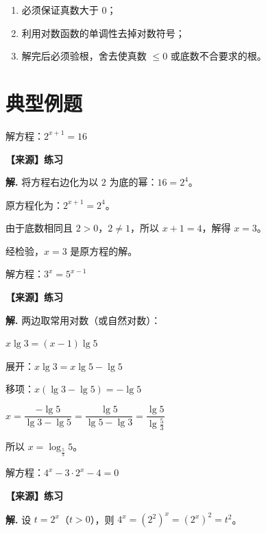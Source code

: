 \documentclass[11pt]{ctexrep}
\begin{document}
\begin{property}[解对数方程的注意事项]
    \begin{enumerate}
        \item 必须保证真数大于 $0$；
        \item 利用对数函数的单调性去掉对数符号；
        \item 解完后必须验根，舍去使真数 $\leq 0$ 或底数不合要求的根。
    \end{enumerate}
\end{property}

\section*{典型例题}

\begin{example}[基本指数方程]
    解方程：$2^{x+1} = 16$
    
    \textbf{【来源】练习}
\end{example}

\textbf{解.} 将方程右边化为以 $2$ 为底的幂：$16 = 2^4$。

原方程化为：$2^{x+1} = 2^4$。

由于底数相同且 $2 > 0$，$2 \neq 1$，所以 $x + 1 = 4$，解得 $x = 3$。

经检验，$x = 3$ 是原方程的解。

\begin{example}[不同底数的指数方程]
    解方程：$3^x = 5^{x-1}$
    
    \textbf{【来源】练习}
\end{example}

\textbf{解.} 两边取常用对数（或自然对数）：

$x\lg 3 = (x-1)\lg 5$

展开：$x\lg 3 = x\lg 5 - \lg 5$

移项：$x(\lg 3 - \lg 5) = -\lg 5$

$x = \dfrac{-\lg 5}{\lg 3 - \lg 5} = \dfrac{\lg 5}{\lg 5 - \lg 3} = \dfrac{\lg 5}{\lg \frac{5}{3}}$

所以 $x = \log_{\frac{5}{3}} 5$。

\begin{example}[可化为二次型的指数方程]
    解方程：$4^x - 3 \cdot 2^x - 4 = 0$
    
    \textbf{【来源】练习}
\end{example}

\textbf{解.} 设 $t = 2^x$（$t > 0$），则 $4^x = (2^2)^x = (2^x)^2 = t^2$。
\end{document}
